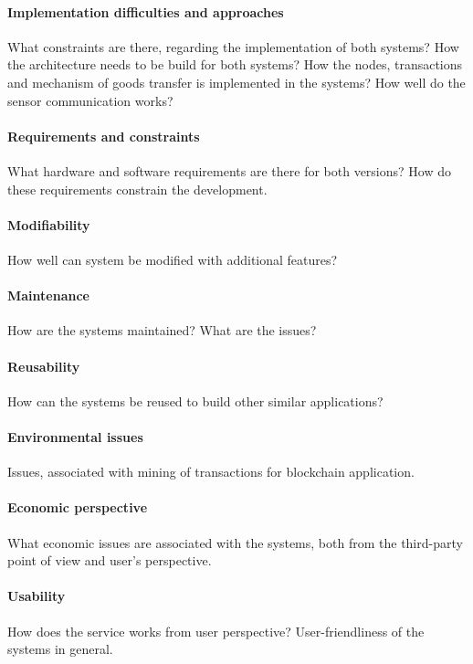 \paragraph{Implementation difficulties and approaches} 
What constraints are there, regarding the implementation of both systems? How the architecture needs to be build for both systems? How the nodes, transactions and mechanism of goods transfer is implemented in the systems?  How well do the sensor communication works?

\paragraph{Requirements and constraints} 
What hardware and software requirements are there for both versions? How do these requirements constrain the development.

\paragraph{Modifiability} 
How well can system be modified with additional features?

\paragraph{Maintenance}
How are the systems maintained? What are the issues?

\paragraph{Reusability} 
How can the systems be reused to build other similar applications?

\paragraph{Environmental issues} 
Issues, associated with mining of transactions for blockchain application. 

\paragraph{Economic perspective} 
What economic issues are associated with the systems, both from the third-party point of view and user's perspective. 

\paragraph{Usability} 
How does the service works from user perspective? User-friendliness of the systems in general.
